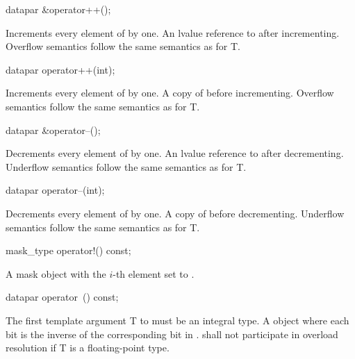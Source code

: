 \begin{itemdecl}
datapar &operator++();
\end{itemdecl}
\begin{itemdescr}
  \pnum\effects Increments every element of  by one.
  \pnum\returns An lvalue reference to  after incrementing.
  \pnum\remarks Overflow semantics follow the same semantics as for \type T.
\end{itemdescr}

\begin{itemdecl}
datapar operator++(int);
\end{itemdecl}
\begin{itemdescr}
  \pnum\effects Increments every element of  by one.
  \pnum\returns A copy of  before incrementing.
  \pnum\remarks Overflow semantics follow the same semantics as for \type T.
\end{itemdescr}

\begin{itemdecl}
datapar &operator--();
\end{itemdecl}
\begin{itemdescr}
  \pnum\effects Decrements every element of  by one.
  \pnum\returns An lvalue reference to  after decrementing.
  \pnum\remarks Underflow semantics follow the same semantics as for \type T.
\end{itemdescr}

\begin{itemdecl}
datapar operator--(int);
\end{itemdecl}
\begin{itemdescr}
  \pnum\effects Decrements every element of  by one.
  \pnum\returns A copy of  before decrementing.
  \pnum\remarks Underflow semantics follow the same semantics as for \type T.
\end{itemdescr}

\begin{itemdecl}
mask_type operator!() const;
\end{itemdecl}
\begin{itemdescr}
  \pnum\returns A mask object with the $i$-th element set to  \foralli.
\end{itemdescr}

\begin{itemdecl}
datapar operator~() const;
\end{itemdecl}
\begin{itemdescr}
  \pnum\requires The first template argument \type T to \datapar must be an integral type.
  \pnum\returns A \datapar object where each bit is the inverse of the corresponding bit in .
  \pnum\remarks \datapar{} shall not participate in overload resolution if \type T is a floating-point type.
\end{itemdescr}

